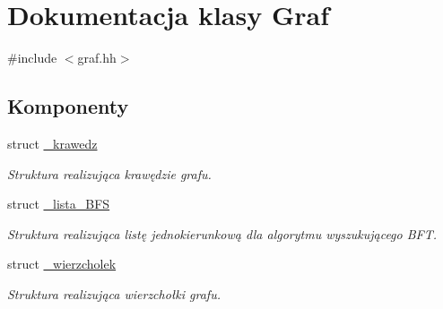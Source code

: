 \hypertarget{class_graf}{\section{\-Dokumentacja klasy \-Graf}
\label{class_graf}
}


{\ttfamily \#include $<$graf.\-hh$>$}

\subsection*{\-Komponenty}
\begin{DoxyCompactItemize}
\item 
struct \hyperlink{struct_graf_1_1__krawedz}{\-\_\-krawedz}
\begin{DoxyCompactList}\small\item\em \-Struktura realizująca krawędzie grafu. \end{DoxyCompactList}\item 
struct \hyperlink{struct_graf_1_1__lista___b_f_s}{\-\_\-lista\-\_\-\-B\-F\-S}
\begin{DoxyCompactList}\small\item\em \-Struktura realizująca listę jednokierunkową dla algorytmu wyszukującego \-B\-F\-T. \end{DoxyCompactList}\item 
struct \hyperlink{struct_graf_1_1__wierzcholek}{\-\_\-wierzcholek}
\begin{DoxyCompactList}\small\item\em \-Struktura realizująca wierzchołki grafu. \end{DoxyCompactList}\end{DoxyCompactItemize}
